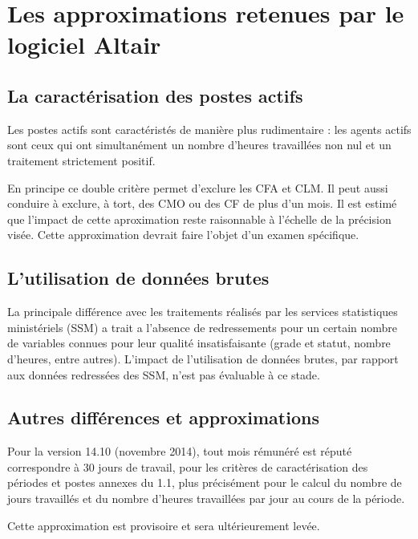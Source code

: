 \documentclass[]{article}
\begin{document}
\section{Les approximations retenues par le logiciel
Altair}\label{les-approximations-retenues-par-le-logiciel-altair}

\subsection{La caractérisation des postes
actifs}\label{la-caracterisation-des-postes-actifs}

Les postes actifs sont caractéristés de manière plus rudimentaire : les
agents actifs sont ceux qui ont simultanément un nombre d'heures
travaillées non nul et un traitement strictement positif.

En principe ce double critère permet d'exclure les CFA et CLM. Il peut
aussi conduire à exclure, à tort, des CMO ou des CF de plus d'un mois.
Il est estimé que l'impact de cette aproximation reste raisonnable à
l'échelle de la précision visée. Cette approximation devrait faire
l'objet d'un examen spécifique.

\subsection{L'utilisation de données
brutes}\label{lutilisation-de-donnees-brutes}

La principale différence avec les traitements réalisés par les services
statistiques ministériels (SSM) a trait a l'absence de redressements
pour un certain nombre de variables connues pour leur qualité
insatisfaisante (grade et statut, nombre d'heures, entre autres).
L'impact de l'utilisation de données brutes, par rapport aux données
redressées des SSM, n'est pas évaluable à ce stade.

\subsection{Autres différences et
approximations}\label{autres-differences-et-approximations}

Pour la version 14.10 (novembre 2014), tout mois rémunéré est réputé
correspondre à 30 jours de travail, pour les critères de caractérisation
des périodes et postes annexes du 1.1, plus précisément pour le calcul
du nombre de jours travaillés et du nombre d'heures travaillées par jour
au cours de la période.

Cette approximation est provisoire et sera ultérieurement levée.
\end{document}
